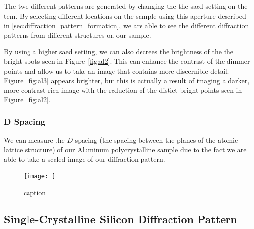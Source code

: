 \documentclass[12pt,a4paper]{article}
\begin{document}
The two different patterns are generated by changing the the \ac{saed} setting on the \ac{tem}.  By selecting different locations on the sample using this aperture described in \ref{sec:diffraction_pattern_formation}, we are able to see the different diffraction patterns from different structures on our sample.

By using a higher \ac{saed} setting, we can also decrees the brightness of the the bright spots seen in Figure~\ref{fig:al2}.  This can enhance the contrast of the dimmer points and allow us to take an image that contains more discernible detail.  Figure~\ref{fig:al3} appears brighter, but this is actually a result of imaging a darker, more contrast rich image with the reduction of the distict bright points seen in Figure~\ref{fig:al2}.


\subsubsection{D Spacing} %
\label{ssub:d_spacing}

We can measure the $D$ spacing (the spacing between the planes of the atomic lattice structure) of our Aluminum polycrystalline sample due to the fact we are able to take a scaled image of our diffraction pattern.

\begin{figure}
  \texttt{[image: ]}
  \caption{caption}
  \label{fig:label}
\end{figure}



\subsection{Single-Crystalline Silicon Diffraction Pattern} %
\label{sub:single_crystaline}

\lipsum[20]
\end{document}
